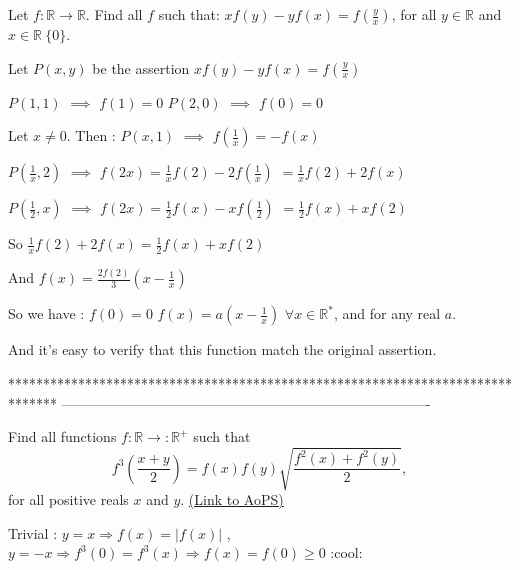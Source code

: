\begin{solution}
	\begin{tcolorbox}Let $ f: \mathbb R \longrightarrow \mathbb R$. Find all $ f$ such that: 
$ xf(y) - yf(x) = f(\frac {y}{x})$, for all $ y\in \mathbb R$ and $ x\in \mathbb R\ \{0\}$.\end{tcolorbox}

Let $ P(x,y)$ be the assertion $ xf(y)-yf(x)=f(\frac{y}{x})$

$ P(1,1)$ $ \implies$ $ f(1)=0$
$ P(2,0)$ $ \implies$ $ f(0)=0$

Let $ x\neq 0$. Then :
$ P(x,1)$ $ \implies$ $ f(\frac{1}{x})=-f(x)$

$ P(\frac{1}{x},2)$ $ \implies$ $ f(2x)=\frac{1}{x}f(2)-2f(\frac{1}{x})$ $ =\frac{1}{x}f(2)+2f(x)$

$ P(\frac{1}{2},x)$ $ \implies$ $ f(2x)=\frac{1}{2}f(x)-xf(\frac{1}{2})$ $ =\frac{1}{2}f(x)+xf(2)$

So $ \frac{1}{x}f(2)+2f(x)=\frac{1}{2}f(x)+xf(2)$

And $ f(x)=\frac{2f(2)}{3}(x - \frac{1}{x})$

So we have :
$ f(0)=0$
$ f(x)=a(x - \frac{1}{x})$ $ \forall x\in \mathbb{R}^*$, and for any real $ a$.

And it's easy to verify that this function match the original assertion.
\end{solution}
*******************************************************************************
-------------------------------------------------------------------------------

\begin{problem}
	Find all functions $ f: \mathbb{R}\rightarrow: \mathbb{R^{+}}$ such that
\[f^3\left(\frac{x+y}{2}\right)=f(x)f(y)\sqrt{\frac{f^2(x)+f^2(y)}{2}},\] for all positive reals $ x$ and $ y$.
	\flushright \href{https://artofproblemsolving.com/community/c6h274544}{(Link to AoPS)}
\end{problem}



\begin{solution}
	Trivial : $ y=x \Longrightarrow f(x)=|f(x)|$ , $ y=-x\Longrightarrow f^3(0)=f^3(x)\Longrightarrow f(x)=f(0) \geq 0$
:cool:
\end{solution}



